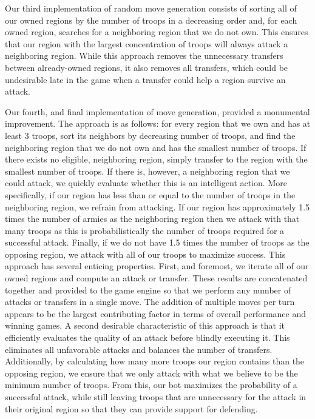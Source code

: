 \documentclass[a4paper,11pt]{article}
\begin{document}
Our third implementation of random move generation consists of sorting all of our owned regions
by the number of troops in a decreasing order and, for each owned region, searches for a neighboring
region that we do not own. This ensures that our region with the largest concentration of troops will
always attack a neighboring region. While this approach removes the unnecessary transfers between 
already-owned regions, it also removes all transfers, which could be undesirable late in the game
when a transfer could help a region survive an attack. 

Our fourth, and final implementation of move generation, provided a monumental improvement.  The 
approach is as follows: for every region that we own and has at least 3 troops, sort its neighbors 
by decreasing number of troops, and find the neighboring region that we do not own and has the smallest
 number of troops. If there exists no eligible, neighboring region, simply transfer to the region with 
the smallest number of troops.  If there is, however, a neighboring region that we could attack, we 
quickly evaluate whether this is  an intelligent action.  More specifically, if our region has less 
than or equal to the number of troops in the neighboring region, we refrain from attacking.  If our 
region has approximately 1.5 times the number of armies as the neighboring region then we attack with 
that many troops as this is probabilistically the number of troops required for a successful attack. 
Finally, if we do not have 1.5 times the number of troops as the opposing region, we attack with all 
of our troops to maximize success. This approach has several enticing properties.  First, and 
foremost, we iterate all of our owned regions and compute an attack or transfer.  These results are 
concatenated together and provided to the game engine so that we perform any number of attacks or 
transfers in a single move.  The addition of multiple moves per turn appears to be the largest 
contributing factor in terms of overall performance and winning games. A second desirable 
characteristic of this approach is that it efficiently evaluates the quality of an attack before blindly
executing it.  This eliminates all unfavorable attacks and balances the number of transfers. 
Additionally, by calculating how many more troops our region contains than the opposing region, we 
ensure that we only attack with what we believe to be the minimum number of troops.  From this, our bot
maximizes the probability of a successful attack, while still leaving troops that are unnecessary for
the attack in their original region so that they can provide support for defending.
\end{document}
